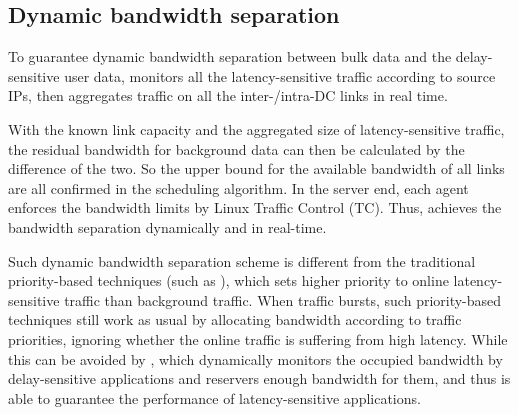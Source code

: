 %
%
%
%

\subsection{Dynamic bandwidth separation}
\label{subsec:system:separation}

To guarantee dynamic bandwidth separation between bulk data and the delay-sensitive user data, \name monitors all the latency-sensitive traffic according to source IPs, then aggregates traffic on all the inter-/intra-DC links in real time.

With the known link capacity and the aggregated size of latency-sensitive traffic, the residual bandwidth for background data can then be calculated by the difference of the two. So the upper bound for the available bandwidth of all links are all confirmed in the scheduling algorithm. In the server end, each agent enforces the bandwidth limits by Linux Traffic Control (TC). Thus, \name achieves the bandwidth separation dynamically and in real-time.

Such dynamic bandwidth separation scheme is different from the traditional priority-based techniques (such as \cite{kumar2015bwe}), which sets higher priority to online latency-sensitive traffic than background traffic. When traffic bursts, such priority-based techniques still work as usual by allocating bandwidth according to traffic priorities, ignoring whether the online traffic is suffering from high latency. While this can be avoided by \name, which dynamically monitors the occupied bandwidth by delay-sensitive applications and reservers enough bandwidth for them, and thus is able to guarantee the performance of latency-sensitive applications.



